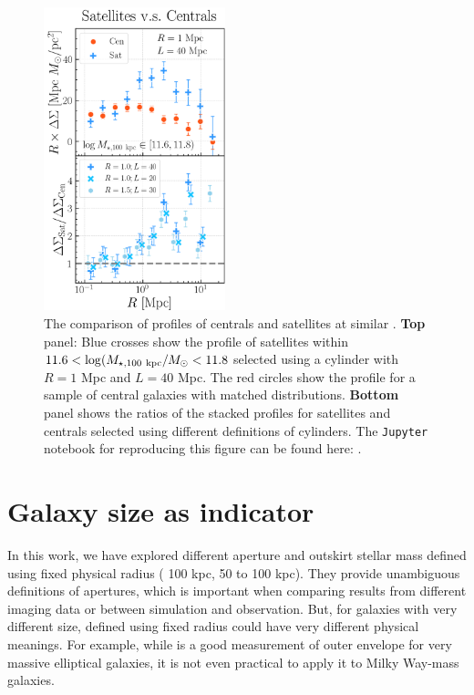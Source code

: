 \documentclass[fleqn,usenatbib,useAMS]{mnras}
\begin{document}
\begin{CJK*}{UTF8}{gbsn}
\begin{figure}
    \centering
    \includegraphics[width=0.47\textwidth]{figure/fig_D1}
    \caption{
        The comparison of \dsigma{} profiles of centrals and satellites at similar \mstar{}.
        \textbf{Top} panel: Blue crosses show the \dsigma{} profile of satellites within 
        $11.6 < \log (M_{\star, 100\ \rm kpc}/M_{\odot} < 11.8$ selected using a cylinder with $R=1$
        Mpc and $L=40$ Mpc. 
        The red circles show the \dsigma{} profile for a sample of central galaxies with matched 
        \mstar{} distributions.
        \textbf{Bottom} panel shows the ratios of the stacked \dsigma{} profiles for satellites 
        and centrals selected using different definitions of cylinders.
        The \texttt{Jupyter} notebook for reproducing this figure can be found here:
        \href{https://github.com/dr-guangtou/jianbing/blob/master/notebooks/figure/figD1.ipynb}{\faGithub}.
    }
    \label{fig:sat_cen}
\end{figure}

\section{Galaxy size as \texorpdfstring{\mvir{}}{Mvir} indicator}
	\label{app:size}

    In this work, we have explored different aperture and outskirt stellar mass defined using 
    fixed physical radius (\eg{} 100 kpc, 50 to 100 kpc).
    They provide unambiguous definitions of apertures, which is important when comparing results
    from different imaging data or between simulation and observation.
    But, for galaxies with very different size, \mstar{} defined using fixed radius could have 
    very different physical meanings. 
    For example, while  is a good measurement of outer envelope \mstar{} for very 
    massive elliptical galaxies, it is not even practical to apply it to Milky Way-mass galaxies.
    

\end{CJK*}
\end{document}
